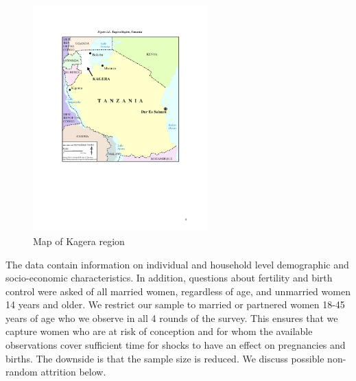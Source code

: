 \documentclass[letterpaper,12pt]{article}
\begin{document}
\begin{figure}[ht] 
 \centering
 \includegraphics[width=0.6\textwidth]{../staticPDF/kagera.pdf}
 \caption{Map of Kagera region}
  \label{fig:kagera_map}
\end{figure}


The data contain information on individual and household level demographic 
and socio-economic characteristics. 
In addition, questions about fertility and birth control were asked of all 
married women, regardless of age, and unmarried women 14 years and older. 
We restrict our sample to married or partnered women 18-45 years of age who we 
observe in all 4 rounds of the survey.
This ensures that we capture women who are at risk of conception and for whom 
the available observations cover sufficient time for shocks to have an effect
on pregnancies and births.
The downside is that the sample size is reduced.
We discuss possible non-random attrition below.
\end{document}
